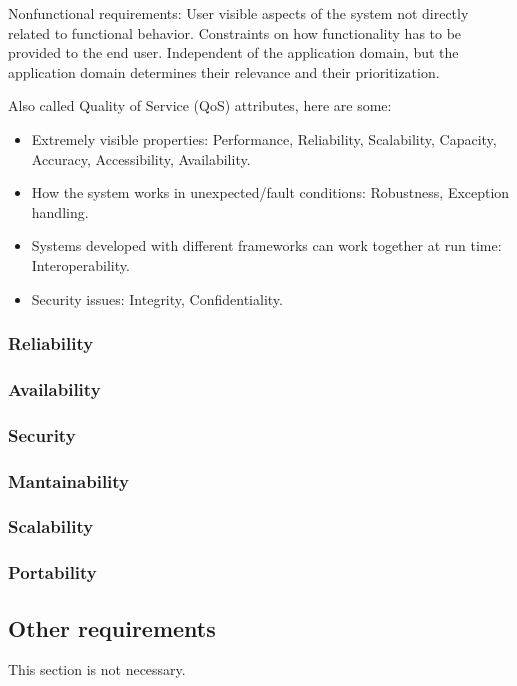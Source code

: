 Nonfunctional requirements: User visible aspects of the system not directly related to functional behavior. 
Constraints on how functionality has to be provided to the end user.
Independent of the application domain, but the application domain determines their relevance and their prioritization.

Also called Quality of Service (QoS) attributes, here are some:
\begin{itemize}
    \item Extremely visible properties: Performance, Reliability, Scalability, Capacity, Accuracy, Accessibility, Availability.
    \item How the system works in unexpected/fault conditions: Robustness, Exception handling.
    \item Systems developed with different frameworks can work together at run time: Interoperability.
    \item Security issues: Integrity, Confidentiality.
\end{itemize}

\subsubsection{Reliability}
\label{subsubsect:reliability}

\subsubsection{Availability}
\label{subsubsect:availability}

\subsubsection{Security}
\label{subsubsect:security}

\subsubsection{Mantainability}
\label{subsubsect:mantainability}

\subsubsection{Scalability}
\label{subsubsect:scalability}

\subsubsection{Portability}
\label{subsubsect:portability}

\subsection{Other requirements}
\label{subsect:otherrequirements}

This section is not necessary.
